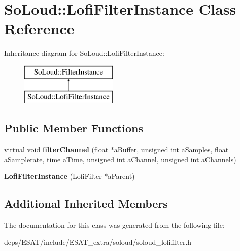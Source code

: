 \hypertarget{class_so_loud_1_1_lofi_filter_instance}{}\section{So\+Loud\+:\+:Lofi\+Filter\+Instance Class Reference}
\label{class_so_loud_1_1_lofi_filter_instance}
Inheritance diagram for So\+Loud\+:\+:Lofi\+Filter\+Instance\+:\begin{figure}[H]
\begin{center}
\leavevmode
\includegraphics[height=2.000000cm]{class_so_loud_1_1_lofi_filter_instance}
\end{center}
\end{figure}
\subsection*{Public Member Functions}
\begin{DoxyCompactItemize}
\item 
\mbox{\label{class_so_loud_1_1_lofi_filter_instance_a7fb089ce7b108786adc194865149c802}} 
virtual void {\bfseries filter\+Channel} (float $\ast$a\+Buffer, unsigned int a\+Samples, float a\+Samplerate, time a\+Time, unsigned int a\+Channel, unsigned int a\+Channels)
\item 
\mbox{\label{class_so_loud_1_1_lofi_filter_instance_afc69d044de0a65c130feca0c1001fa91}} 
{\bfseries Lofi\+Filter\+Instance} (\mbox{\hyperlink{class_so_loud_1_1_lofi_filter}{Lofi\+Filter}} $\ast$a\+Parent)
\end{DoxyCompactItemize}
\subsection*{Additional Inherited Members}


The documentation for this class was generated from the following file\+:\begin{DoxyCompactItemize}
\item 
deps/\+E\+S\+A\+T/include/\+E\+S\+A\+T\+\_\+extra/soloud/soloud\+\_\+lofifilter.\+h\end{DoxyCompactItemize}
